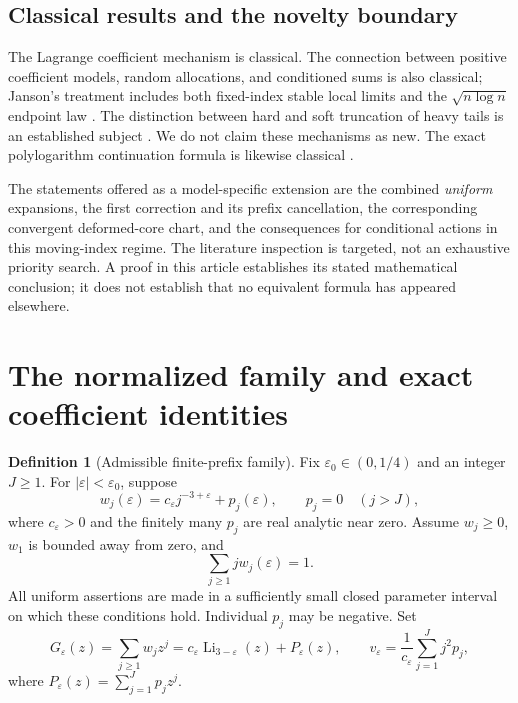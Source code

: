 \documentclass[11pt,a4paper]{article}
\numberwithin{equation}{section}
\theoremstyle{definition}
\newtheorem{definition}[theorem]{Definition}
\theoremstyle{remark}
\newcommand{\eps}{\varepsilon}
\newcommand{\Li}{\operatorname{Li}}
\begin{document}
\subsection{Classical results and the novelty boundary}
The Lagrange coefficient mechanism is classical. The connection between
positive coefficient models, random allocations, and conditioned sums is
also classical; Janson's treatment includes both fixed-index stable local
limits and the \(\sqrt{n\log n}\) endpoint law
\cite[Theorem 17.14 and Example 18.29]{janson}.
The distinction between hard and soft truncation of heavy tails is an
established subject \cite{chakrabarty}. We do not claim these mechanisms as
new. The exact polylogarithm continuation formula is likewise classical
\cite[Eq. 25.12.12]{dlmf-polylog}.

The statements offered as a model-specific extension are the combined
\emph{uniform} expansions, the first correction and its prefix cancellation,
the corresponding convergent deformed-core chart, and the consequences for
conditional actions in this moving-index regime. The literature inspection
is targeted, not an exhaustive priority search. A proof in this article
establishes its stated mathematical conclusion; it does not establish that
no equivalent formula has appeared elsewhere.

\section{The normalized family and exact coefficient identities}
\label{sec:model}

\begin{definition}[Admissible finite-prefix family]
Fix \(\eps_0\in(0,1/4)\) and an integer \(J\ge1\). For
\(|\eps|<\eps_0\), suppose
\begin{equation}
 w_j(\eps)=c_{\eps}j^{-3+\eps}+p_j(\eps),\qquad
 p_j=0\quad(j>J),
 \label{eq:weights}
\end{equation}
where \(c_{\eps}>0\) and the finitely many \(p_j\) are real analytic near zero.
Assume \(w_j\ge0\), \(w_1\) is bounded away from zero, and
\begin{equation}
 \sum_{j\ge1}jw_j(\eps)=1.
 \label{eq:criticality}
\end{equation}
All uniform assertions are made in a sufficiently small closed parameter
interval on which these conditions hold. Individual \(p_j\) may be negative.
Set
\begin{equation}
 G_{\eps}(z)=\sum_{j\ge1}w_jz^j
 =c_{\eps}\Li_{3-\eps}(z)+P_{\eps}(z),\qquad
 v_{\eps}=\frac{1}{c_{\eps}}\sum_{j=1}^J j^2p_j,
 \label{eq:G}
\end{equation}
where \(P_{\eps}(z)=\sum_{j=1}^Jp_jz^j\).
\end{definition}
\end{document}
